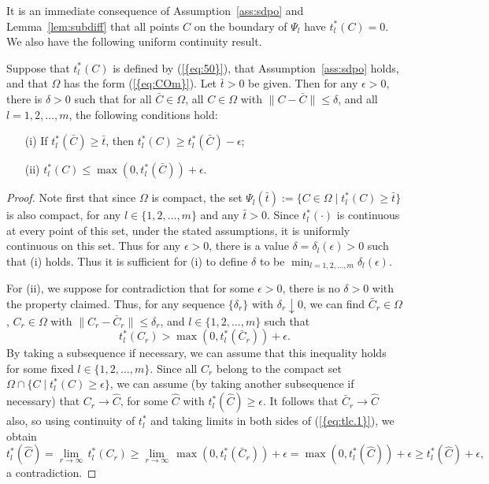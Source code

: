 \documentclass{siamltex}
\begin{document}
It is an immediate consequence of Assumption~\ref{ass:sdpo} and
Lemma~\ref{lem:subdiff} that all points $C$ on the boundary of
$\Psi_l$ have $t^*_l(C)=0$.  We also have the following uniform
continuity result.
\begin{lemma} \label{lem:tlc} Suppose that $t^*_l(C)$ is defined by
  {(\ref{{eq:50}})}, that Assumption~\ref{ass:sdpo} holds, and that
$\Omega$ has the form {(\ref{{eq:COm}})}. Let
  $\bar{t}>0$ be given. Then for any $\epsilon>0$, there is $\delta>0$
  such that for all $\bar{C}\in \Omega$, all $C \in \Omega$ with $\|
  C-\bar{C} \| \le \delta$, and all $l=1,2,\dotsc,m$, the following
  conditions hold:
\begin{itemize}
\item[(i)] If $t^*_l(\bar{C}) \ge \bar{t}$, then $t^*_l(C) \ge
t^*_l(\bar{C}) - \epsilon$;
\item[(ii)] $t^*_l(C) \le \max(0,t^*_l(\bar{C})) + \epsilon$.
\end{itemize}
\end{lemma}
\begin{proof}
  Note first that since $\Omega$ is compact, the set 
  $\Psi_l(\bar{t}) := \{ C \in \Omega \mid t^*_l(C) \ge \bar{t} \}$ is
  also compact, for any $l\in \{1,2,\dotsc,m\}$ and any $\bar{t} > 0$.
Since $t^*_l(\cdot)$ is continuous at every point of this set, under
the stated assumptions, it is uniformly continuous on this set. Thus
for any $\epsilon>0$, there is a value $\delta = \delta_l(\epsilon)>0$
such that (i) holds. Thus it is sufficient for (i) to define $\delta$
to be $\min_{l=1,2,\dotsc,m} \delta_l(\epsilon)$. 

For (ii), we suppose for contradiction that for some $\epsilon>0$,
there is no $\delta>0$ with the property claimed. Thus, for any
sequence $\{ \delta_r \}$ with $\delta_r \downarrow 0$, we can find
$\bar{C}_r \in \Omega$, $C_r \in \Omega$ with $\| C_r - \bar{C}_r \|
\le \delta_r$, and $l \in \{1,2,\dotsc,m\}$ such that
\begin{equation} \label{eq:tlc.1}
t^*_l(C_r) > \max(0, t^*_l(\bar{C}_r)) + \epsilon.
\end{equation}
By taking a subsequence if necessary, we can assume that this
inequality holds for some fixed $l \in \{1,2,\dotsc,m\}$. Since all
$C_r$ belong to the compact set $\Omega \cap \{ C \mid t^*_l(C) \ge
\epsilon \}$, we can assume (by taking another subsequence if
necessary) that $C_r \to \hat{C}$, for some $\hat{C}$ with
$t^*_l(\hat{C}) \ge \epsilon$. It follows that $\bar{C}_r \to \hat{C}$
also, so using continuity of $t^*_l$ and taking limits in both sides
of {(\ref{{eq:tlc.1}})}, we obtain
\[
t^*_l(\hat{C}) = \lim_{r \to \infty} \, t^*_l(C_r) \ge \lim_{r \to \infty}
\, \max(0, t^*_l(\bar{C}_r)) + \epsilon  = \max(0,t^*_l(\hat{C})) + \epsilon
\ge t^*_l(\hat{C}) + \epsilon,
\]
a contradiction.
\end{proof}
\end{document}
